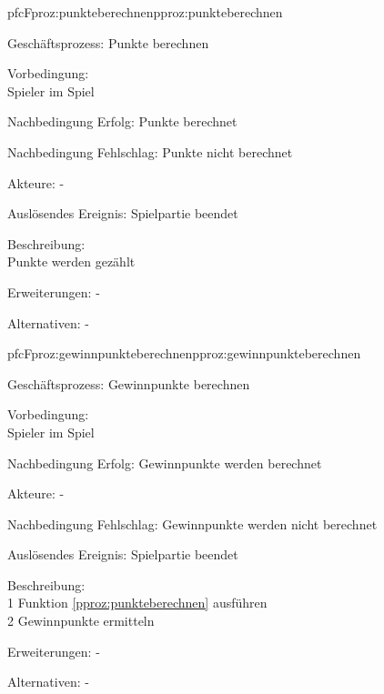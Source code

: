 \begin{description}[leftmargin=3em, style=sameline]
	\begin{php}{pfc}{F}{proz:punkteberechnen}{pproz:punkteberechnen}
		\item [Geschäftsprozess:] Punkte berechnen
		\item [Vorbedingung:] \hfill\\
		Spieler im Spiel
		\item [Nachbedingung Erfolg:] Punkte berechnet
		\item [Nachbedingung Fehlschlag:] Punkte nicht berechnet
		\item [Akteure:] -
		\item [Auslösendes Ereignis:] Spielpartie beendet
		\item [Beschreibung:] \hfill\\
		Punkte werden gezählt
		\item [Erweiterungen:] -
		\item [Alternativen:] -
	\end{php}
	
	\begin{php}{pfc}{F}{proz:gewinnpunkteberechnen}{pproz:gewinnpunkteberechnen}
		\item [Geschäftsprozess:] Gewinnpunkte berechnen
		\item [Vorbedingung:]\hfill\\
		Spieler im Spiel
		\item [Nachbedingung Erfolg:] Gewinnpunkte werden berechnet
		\item [Akteure:] -
		\item [Nachbedingung Fehlschlag:] Gewinnpunkte werden nicht berechnet
		\item [Auslösendes Ereignis:] Spielpartie beendet
		\item [Beschreibung:] \hfill\\
		1 Funktion \ref{pproz:punkteberechnen} ausführen \\
		2 Gewinnpunkte ermitteln
		\item [Erweiterungen:] -
		\item [Alternativen:] -
	\end{php}
	

\end{description}
